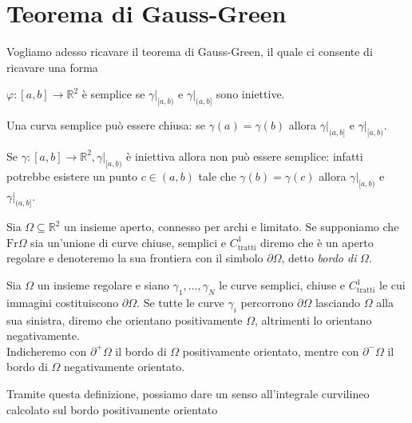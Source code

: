 \section{Teorema di Gauss-Green}
Vogliamo adesso ricavare il teorema di Gauss-Green, il quale ci consente di ricavare una forma 
\begin{theorem}
	$\varphi: [a, b] \to \mathbb{R}^2$ è semplice se $\gamma|_{[a, b)}$ e $\gamma|_{(a, b]}$ sono iniettive.
\end{theorem}
\begin{remark}
	Una curva semplice può essere chiusa: se $\gamma(a) = \gamma(b)$ allora $\gamma|_{(a, b]}$ e $\gamma|_{[a, b)}$.
\end{remark}
\begin{remark}
	Se $\gamma: [a, b] \to \mathbb{R}^2, \gamma|_{[a, b)}$ è iniettiva allora non può essere semplice: infatti potrebbe esistere un punto $c \in (a, b)$ tale che
	$\gamma(b) = \gamma(c)$ allora $\gamma|_{[a, b)}$ e $\gamma|_{(a, b]}$.
\end{remark}
\begin{definition}
	Sia $\Omega \subseteq \mathbb{R}^2$ un insieme aperto, connesso per archi e limitato. Se supponiamo che $\text{Fr}\Omega$ sia un'unione di curve chiuse, semplici e $C^1_\text{tratti}$ diremo che
	è un aperto regolare e denoteremo la sua frontiera con il simbolo $\partial \Omega$, detto \emph{bordo di} $\Omega$.
\end{definition}
\begin{definition}
	Sia $\Omega$ un insieme regolare e siano $\gamma_1, \ldots, \gamma_N$ le curve semplici, chiuse e $C^1_\text{tratti}$ le cui immagini costituiscono $\partial \Omega$. Se tutte le curve $\gamma_i$ percorrono
	$\partial \Omega$ lasciando $\Omega$ alla sua sinistra, diremo che orientano positivamente $\Omega$, altrimenti lo orientano negativamente. \\
	Indicheremo con $\partial^{+} \Omega$ il bordo di $\Omega$ positivamente orientato, mentre con $\partial^{-} \Omega$ il bordo di $\Omega$ negativamente orientato.
\end{definition}
Tramite questa definizione, possiamo dare un senso all'integrale curvilineo calcolato sul bordo positivamente orientato

